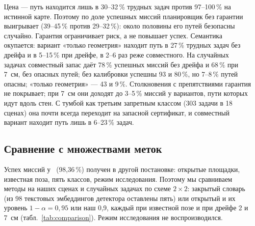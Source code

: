 Цена --- путь находится лишь в 30--32\,\% трудных задач против 97--100\,\% на истинной карте. Поэтому по доле успешных миссий планировщик без гарантии выигрывает (39--45\,\% против 29--32\,\%): около половины его путей безопасны случайно. Гарантия ограничивает риск, а не повышает успех. Семантика окупается: вариант «только геометрия» находит путь в 27\,\% трудных задач без дрейфа и в 5--15\,\% при дрейфе, в 2--6 раз реже совместного. На случайных задачах совместный запас даёт 78\,\% успешных миссий без дрейфа и 68\,\% при 7~см, без опасных путей; без калибровки успешны 93 и 80\,\%, но 7--8\,\% путей опасны; «только геометрия» --- 43 и 9\,\%. Столкновения с препятствиями гарантия не покрывает; при 7~см они доходят до 3--5\,\% миссий у вариантов, пути которых идут вдоль стен. С тумбой как третьим запретным классом (303 задачи в 18 сценах) она почти всегда переходит на запасной сертификат, и совместный вариант находит путь лишь в 6--23\,\% задач.

\subsection{Сравнение с множествами меток}\label{sec:comparison}

\begin{table}[htbp]
\centering\scriptsize\setlength{\tabcolsep}{3.5pt}
\caption{Случайные задачи (420 в 21 сцене): доля успешных миссий; $^\ast$ --- есть опасные пути}
\label{tab:comparison}

\end{table}

Успех миссий у~\cite{sundarsingh} (98,36\,\%) получен в другой постановке: открытые площадки, известная поза, пять классов, режим исследования. Поэтому мы сравниваем методы на наших сценах и случайных задачах по схеме $2 \times 2$: закрытый словарь (из 98 текстовых эмбеддингов детектора оставлены пять) или открытый и их уровень $1 - \alpha = 0{,}95$ или наш 0,9, каждый при известной позе и при дрейфе 2 и 7~см (табл.~\ref{tab:comparison}). Режим исследования не воспроизводился.

